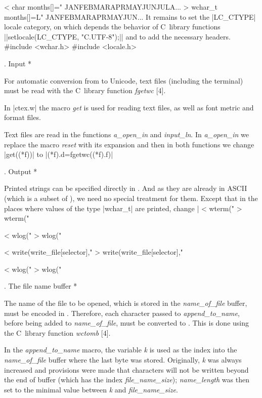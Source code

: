 < char months[]=" JANFEBMARAPRMAYJUNJULA...
> wchar_t months[]=L" JANFEBMARAPRMAYJUN... 
\endverbatim
\medskip
It remains to set the |LC_CTYPE| locale category, on which
depends the behavior of C~library functions
||setlocale(LC_CTYPE, "C.UTF-8");||
and to add the necessary headers.
\verbatim
#include <wchar.h>
#include <locale.h>
\endverbatim

. Input *

For automatic conversion from  to Unicode,
text files (including the terminal) must be
read with the C~library function \hbox{\it fgetwc\/} [4].

In |ctex.w| the macro {\it get\/}
is used for reading text files, as well as
font metric and format files.

Text files are read in the functions
{\it a\_open\_in\/} and
{\it input\_ln\/}.
In
{\it a\_open\_in\/} we replace the macro
{\it reset\/}
with its expansion and then in both functions
we change |get((*f))| to |(*f).d=fgetwc((*f).f)|

. Output *

Printed strings can be specified directly in .
And as they are already in ASCII (which is a
subset of ),
we need no special treatment for them.
Except that
in the places where values of the type |wchar_t| are printed, change
|%
\smallskip
\verbatim
< wterm("%c",xchr[s]);
> wterm("%lc",xchr[s]);

< wlog("%c",xchr[s]);
> wlog("%lc",xchr[s]);

< write(write_file[selector],"%c",xchr[s]);
> write(write_file[selector],"%lc",xchr[s]);

< wlog("%c",months[k]);
> wlog("%lc",months[k]);
\endverbatim

. The file name buffer *

The name of the file to be opened, which is
stored in the {\it name\_of\_file\/} buffer,
must be encoded in \hbox{}.
Therefore, each character passed to {\it append\_to\_name\/},
before being added to {\it name\_of\_file\/},
must
be converted to \hbox{}. This is done using
the C~library function {\it wctomb\/} [4].

In the {\it append\_to\_name\/} macro, the variable
{\it k\/}
is used as the index into the {\it name\_of\_file\/} buffer
where the last byte was stored. Originally, {\it k\/} was
always increased and provisions were made
that characters will not be written beyond the end of buffer
(which has the index {\it file\_name\_size\/});
{\it name\_length\/} was then set to the minimal value
between {\it k\/} and {\it file\_name\_size\/}.

